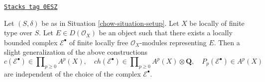 \begin{lemma}
\label{chow-lemma-pre-derived-chern-class}
\href{https://stacks.math.columbia.edu/tag/0ESZ}{\texttt{Stacks tag 0ESZ}}

Let $(S, \delta)$ be as in Situation \ref{chow-situation-setup}.
Let $X$ be locally of finite type over $S$. Let $E \in D(\mathcal{O}_X)$
be an object such that there exists a locally bounded complex
$\mathcal{E}^\bullet$ of finite locally free $\mathcal{O}_X$-modules
representing $E$. Then a slight generalization of the above constructions
$$
c(\mathcal{E}^\bullet) \in \prod\nolimits_{p \geq 0} A^p(X),\quad
ch(\mathcal{E}^\bullet) \in
\prod\nolimits_{p \geq 0} A^p(X) \otimes \mathbf{Q},\quad
P_p(\mathcal{E}^\bullet) \in A^p(X)
$$
are independent of the choice of the complex $\mathcal{E}^\bullet$.
\end{lemma}

